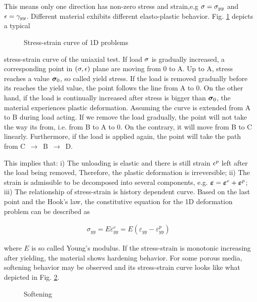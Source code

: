 This means only one direction has non-zero stress and strain,e.g $\sigma=\sigma_{yy}$ and $\epsilon=\gamma_{yy}$.
Different material exhibits different elasto-plastic behavior. Fig. \ref{fig:uniax_lp} depicts a typical

\begin{figure}[!htb]
  \centering
  
  \caption{Stress-strain curve of 1D problems }
  \label{fig:uniax_lp}
\end{figure}

stress-strain curve of the uniaxial test. If load $\sigma$ is gradually increased, a corresponding point in $(\sigma, \epsilon)$ plane are moving from 0 to A. Up to A, stress reaches a value $\bm \sigma_0$, so called yield stress. If the load is removed gradually before its reaches the yield value, the point follows the line from A to 0. On the other hand, if the load is continually increased after stress is bigger than   $\bm \sigma_0$, the material experiences plastic deformation. Assuming the curve is extended from A to B during load acting. If we remove the load gradually, the point  will not take the way its from, i.e. from B to A to 0. On the contrary, it will move from B to C linearly. Furthermore, if the load is applied again, the point will take the path from \mbox{C $\longrightarrow$ B $\longrightarrow$ D}.

This implies that: i) The unloading is elastic and there is still strain $\epsilon^p$ left after the load being removed,
Therefore, the plastic deformation is irreversible; ii) The strain is admissible to be decomposed into several
components, e.g. $\boldsymbol{\varepsilon}=\boldsymbol{\varepsilon}^e+\boldsymbol{\varepsilon}^p$; iii) The relationship of stress-strain is history dependent curve.  Based on the last point and the  Hook's law, the constitutive equation for the 1D deformation problem can be described as

\begin{eqnarray}
\sigma_{yy}=E\varepsilon_{yy}^e=E(\varepsilon_{yy}-\varepsilon_{yy}^p)
\label{eqn:constitu_M_1D}
\end{eqnarray}

where $E$ is so called Young's modulus. If the stress-strain is monotonic increasing after yielding, the material shows hardening behavior. For some porous media, softening  behavior may be observed and its stress-strain curve looks like what depicted in Fig. \ref{fig:uniax_lp1}.

\begin{figure}[!htb]
  \centering
  
  \caption{Softening }
  \label{fig:uniax_lp1}
\end{figure}


